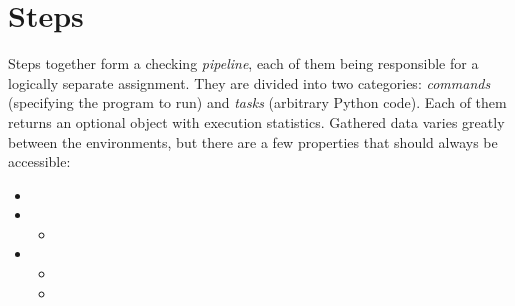 \section{Steps}\label{sec:steps}

    Steps together form a checking \textit{pipeline}, each of them being responsible for a logically separate assignment.
    They are divided into two categories: \textit{commands} (specifying the program to run) and \textit{tasks}
    (arbitrary Python code).
     \label{sec:ExecutionStatistics} Each of them returns an optional object with execution statistics.
    Gathered data varies greatly between the environments, but there are a few properties that should always be
    accessible:\clearpage
    \begin{itemize}
        \item {}
        \item {}
              \begin{itemize}
                  \item {}
              \end{itemize}
        \item {}
              \begin{itemize}
                  \item {}
                  \item {}
              \end{itemize}
    \end{itemize}




